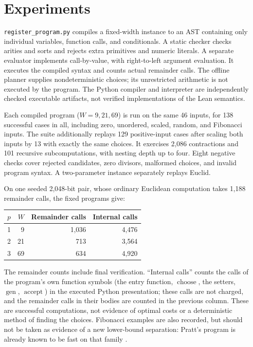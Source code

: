 \documentclass[11pt]{article}
\newcommand{\Gen}{\operatorname{gen}}
\newcommand{\Pick}{\operatorname{choose}}
\newcommand{\AcceptCandidate}{\operatorname{accept}}
\begin{document}
\section{Experiments}

\texttt{register\_program.py} compiles a fixed-width instance to an AST
containing only individual variables, function calls, and conditionals.
A static checker checks arities and sorts and rejects extra primitives and
numeric literals. A separate evaluator implements call-by-value, with
right-to-left argument evaluation. It executes the compiled syntax and counts
actual remainder calls. The offline planner supplies nondeterministic choices;
its unrestricted arithmetic is not executed by the program. The Python
compiler and interpreter are independently checked executable artifacts,
not verified implementations of the Lean semantics.

Each compiled program ($W=9,21,69$) is run on the same 46 inputs, for 138
successful cases in all, including zero, unordered, scaled, random, and
Fibonacci inputs. The suite additionally replays 129 positive-input cases
after scaling both inputs by 13 with exactly the same choices. It exercises
2,086 contractions and 101 recursive subcomputations, with nesting depth up
to four. Eight negative checks cover rejected candidates, zero divisors,
malformed choices, and invalid program syntax. A two-parameter instance
separately replays Euclid.

On one seeded 2,048-bit pair, whose ordinary Euclidean computation takes
1,188 remainder calls, the fixed programs give:
\begin{center}
\begin{tabular}{rrrr}
\toprule
$p$ & $W$ & Remainder calls & Internal calls\\
\midrule
1 & 9 & 1,036 & 4,476\\
2 & 21 & 713 & 3,564\\
3 & 69 & 634 & 4,920\\
\bottomrule
\end{tabular}
\end{center}
The remainder counts include final verification. ``Internal calls'' counts
the calls of the program's own function symbols (the entry function, $\Pick$,
the setters, $\Gen$, $\AcceptCandidate$) in the executed Python presentation;
these calls are not charged, and the remainder calls in their bodies are
counted in the previous column. These are successful
computations, not evidence of optimal costs or a deterministic method of
finding the choices. Fibonacci examples are also recorded, but should not
be taken as evidence of a new lower-bound separation: Pratt's program is
already known to be fast on that family \cite[Corollary~6C.7]{book}.
\end{document}

